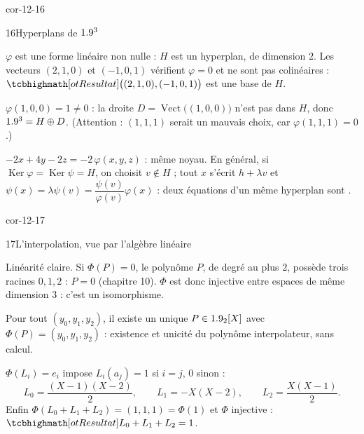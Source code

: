 \begin{blocLivre}{cor-12-16}
\begin{corrige}{16}{Hyperplans de $1.9^{3}$}
\begin{questions}
  \item $\varphi$ est une forme linéaire non nulle : $H$ est un hyperplan,
    de dimension $2$. Les vecteurs $(2,1,0)$ et $(-1,0,1)$ vérifient
    $\varphi=0$ et ne sont pas colinéaires :
    $\res{\bigl((2,1,0),(-1,0,1)\bigr)}$ est une base de $H$.
  \item $\varphi(1,0,0)=1\neq0$ : la droite
    $D=\operatorname{Vect}\bigl((1,0,0)\bigr)$ n'est pas dans $H$, donc
    $1.9^{3}=H\oplus D$. (Attention : $(1,1,1)$ serait un mauvais choix,
    car $\varphi(1,1,1)=0$.)
  \item $-2x+4y-2z=-2\,\varphi(x,y,z)$ : même noyau. En général, si
    $\operatorname{Ker}\varphi=\operatorname{Ker}\psi=H$, on choisit
    $v\notin H$ ; tout $x$ s'écrit $h+\lambda v$ et
    $\psi(x)=\lambda\psi(v)=\dfrac{\psi(v)}{\varphi(v)}\varphi(x)$ : deux
    équations d'un même hyperplan sont .
\end{questions}
\end{corrige}
\end{blocLivre}

\begin{blocLivre}{cor-12-17}
\begin{corrige}{17}{L'interpolation, vue par l'algèbre linéaire}
\begin{questions}
  \item Linéarité claire. Si $\Phi(P)=0$, le polynôme $P$, de degré au plus
    $2$, possède trois racines $0,1,2$ : $P=0$ (chapitre 10). $\Phi$ est
    donc injective entre espaces de même dimension $3$ : c'est un
    isomorphisme.
  \item Pour tout $(y_0,y_1,y_2)$, il existe un unique $P\in1.9_2[X]$ avec
    $\Phi(P)=(y_0,y_1,y_2)$ : existence et unicité du polynôme
    interpolateur, sans calcul.
  \item $\Phi(L_i)=e_i$ impose $L_i(a_j)=1$ si $i=j$, $0$ sinon :
    \[
    L_0=\frac{(X-1)(X-2)}{2},\qquad L_1=-X(X-2),\qquad
    L_2=\frac{X(X-1)}{2}.
    \]
    Enfin $\Phi(L_0+L_1+L_2)=(1,1,1)=\Phi(1)$ et $\Phi$ injective :
    $\res{L_0+L_1+L_2=1}$.
\end{questions}
\end{corrige}
\end{blocLivre}

